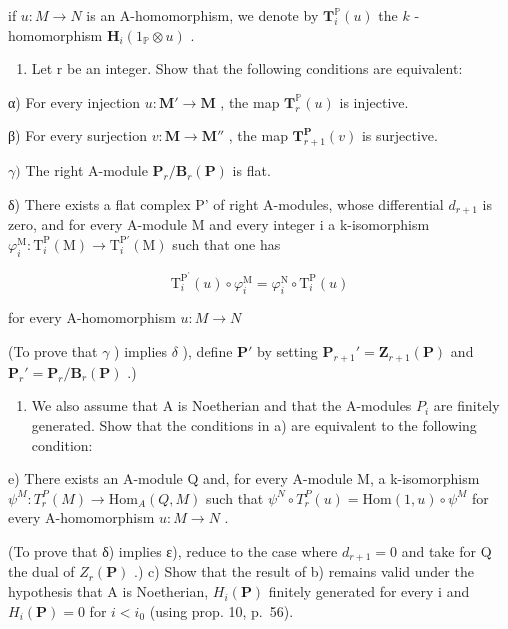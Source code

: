 if \(u:M\to N\) is an A-homomorphism, we denote by \(\mathbf{T}_{i}^{\mathbb{P}}(u)\) the \(k\) -homomorphism \(\mathbf{H}_{i}(1_{\mathbb{P}}\otimes u)\) .

\begin{enumerate}
\def\labelenumi{\alph{enumi})}
\tightlist
\item
  Let r be an integer. Show that the following conditions are equivalent:
\end{enumerate}

α) For every injection \(u: \mathbf{M}' \to \mathbf{M}\) , the map \(\mathbf{T}_{r}^{\mathbb{P}}(u)\) is injective.

β) For every surjection \(v: \mathbf{M} \to \mathbf{M}''\) , the map \(\mathbf{T}_{r+1}^{\mathbf{P}}(v)\) is surjective.

\(\gamma)\) The right A-module \(\mathbf{P}_{r}/\mathbf{B}_{r}(\mathbf{P})\) is flat.

δ) There exists a flat complex P' of right A-modules, whose differential \(d_{r+1}\) is zero, and for every A-module M and every integer i a k-isomorphism \(\varphi_{i}^{\mathrm{M}} : \mathrm{T}_{i}^{\mathrm{P}}(\mathrm{M}) \to \mathrm{T}_{i}^{\mathrm{P}'}(\mathrm{M})\) such that one has

\[
\mathrm{T} _ {i} ^ {\mathrm{P} ^ {\prime}} (u) \circ \varphi_ {i} ^ {\mathrm{M}} = \varphi_ {i} ^ {\mathrm{N}} \circ \mathrm{T} _ {i} ^ {\mathrm{P}} (u)
\]

for every A-homomorphism \(u:M\to N\)

(To prove that \(\gamma\) ) implies \(\delta\) ), define \(\mathbf{P}'\) by setting \(\mathbf{P}_{r+1}' = \mathbf{Z}_{r+1}(\mathbf{P})\) and \(\mathbf{P}_r' = \mathbf{P}_r / \mathbf{B}_r(\mathbf{P})\) .)

\begin{enumerate}
\def\labelenumi{\alph{enumi})}
\setcounter{enumi}{1}
\tightlist
\item
  We also assume that A is Noetherian and that the A-modules \(P_{i}\) are finitely generated. Show that the conditions in a) are equivalent to the following condition:
\end{enumerate}

e) There exists an A-module Q and, for every A-module M, a k-isomorphism \(\psi^{M}: T_{r}^{P}(M) \to \text{Hom}_{A}(Q, M)\) such that \(\psi^{N} \circ T_{r}^{P}(u) = \text{Hom}(1, u) \circ \psi^{M}\) for every A-homomorphism \(u: M \to N\) .

(To prove that δ) implies ε), reduce to the case where \(d_{r+1} = 0\) and take for Q the dual of \(Z_{r}(\mathbf{P})\) .) c) Show that the result of b) remains valid under the hypothesis that A is Noetherian, \(H_{i}(\mathbf{P})\) finitely generated for every i and \(H_{i}(\mathbf{P}) = 0\) for \(i < i_{0}\) (using prop. 10, p.~56).


